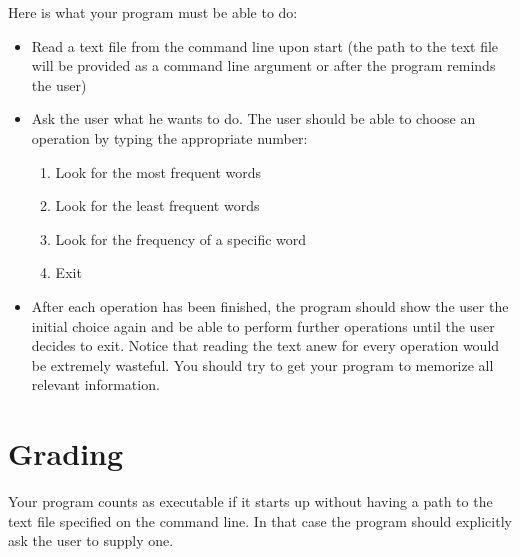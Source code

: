 \documentclass[11pt, leqno, a4paper]{article}
\begin{document}
Here is what your program must be able to do:
\begin{itemize}
\item Read a text file from the command line upon start (the path to the text file will be provided as a command line argument or after the program reminds the user)
\item Ask the user what he wants to do. The user should be able to choose an operation by typing the appropriate number:
\begin{enumerate}
\item Look for the most frequent words
\item Look for the least frequent words
\item Look for the frequency of a specific word
\item Exit
\end{enumerate}
\item After each operation has been finished, the program should show the user the initial choice again and be able to perform further operations until the
user decides to exit. Notice that reading the text anew for every operation would be extremely wasteful. You should try to get your program to memorize all
relevant information.
\end{itemize}

\section{Grading}
Your program counts as executable if it starts up without having a path to the text file specified on the command line. In that case the program should
explicitly ask the user to supply one.
\end{document}
